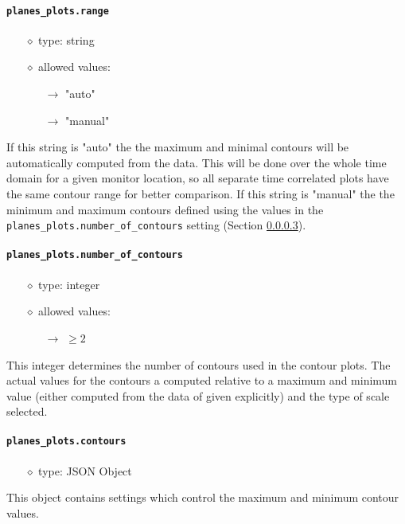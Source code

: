 \documentclass[]{article}
\def\code#1{\texttt{#1}}
\begin{document}
\paragraph{\code{planes\_plots.range}}
\begin{itemize}
    \item[$\diamond$] type: string 
    \item[$\diamond$] allowed values:
    \begin{itemize}
        \item[$\rightarrow$] "auto"
        \item[$\rightarrow$] "manual"
    \end{itemize}
\end{itemize}
If this string is "auto" the the maximum and minimal contours will be
automatically computed from the data. This will be done over the whole time
domain for a given monitor location, so all separate time correlated plots have
the same contour range for better comparison. If this string is "manual" the the
minimum and maximum contours defined using the values in the
\code{planes\_plots.number\_of\_contours} setting
(Section \ref{sec:numcontour}).

\paragraph{\code{planes\_plots.number\_of\_contours}}\label{sec:numcontour}
\begin{itemize}
    \item[$\diamond$] type: integer 
    \item[$\diamond$] allowed values:
    \begin{itemize}
        \item[$\rightarrow$] $\geq2$
    \end{itemize}
\end{itemize}
This integer determines the number of contours used in the contour plots. The
actual values for the contours a computed relative to a maximum and minimum
value (either computed from the data of given explicitly) and the type of scale
selected.

\paragraph{\code{planes\_plots.contours}}\label{sec:numcontour}
\begin{itemize}
    \item[$\diamond$] type: JSON Object 
\end{itemize}
This object contains settings which control the maximum and minimum contour
values.
\end{document}
